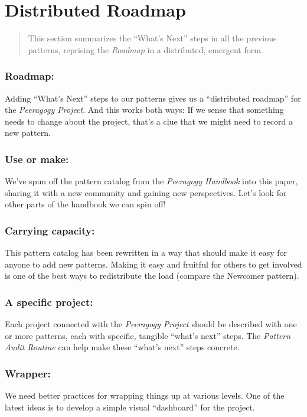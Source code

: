 \section{Distributed Roadmap}

\begin{quote}
This section summarizes the ``What's Next'' steps in all the previous
patterns, reprising the \emph{Roadmap} in a distributed, emergent form.
\end{quote}

\subsubsection*{Roadmap:} Adding ``What's Next'' steps to our patterns gives us a ``distributed roadmap'' for the \emph{Peeragogy Project}.  And this works both ways:  
If we sense that something needs to change about the project, that's a
clue that we might need to record a new pattern.

\subsubsection*{Use or make:} 
We've spun off the pattern catalog from the \emph{Peeragogy Handbook} into this paper, sharing it with a new community and gaining new perspectives.  Let's look for other parts of the handbook we can spin off!

\subsubsection*{Carrying capacity:} This pattern catalog has been rewritten in a way that should make it
easy for anyone to add new patterns. Making it easy and fruitful for
others to get involved is one of the best ways to redistribute the load
(compare the Newcomer pattern).

\subsubsection*{A specific project:} 
 Each project connected with the \emph{Peeragogy Project} should be described with one or more patterns, each with specific, tangible ``what's next'' steps.  The \emph{Pattern Audit Routine} can help make these ``what's next'' steps concrete.

\subsubsection*{Wrapper:}  We need better practices for wrapping things up at
various levels.  One of the latest ideas is to develop a simple visual
``dashboard'' for the project.


